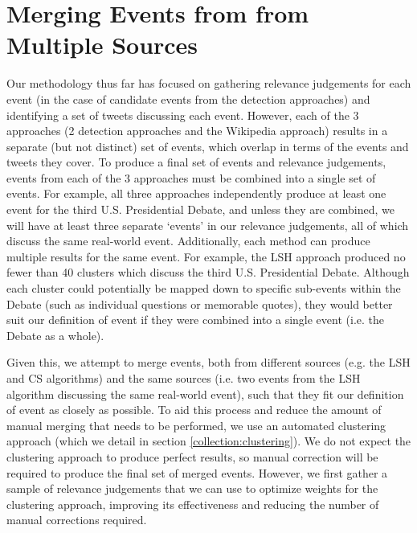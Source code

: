 \section{Merging Events from from Multiple Sources}
\label{sec:merge}
Our methodology thus far has focused on gathering relevance judgements for each event (in the case of candidate events from the detection approaches) and identifying a set of tweets discussing each event.
However, each of the 3 approaches (2 detection approaches and the Wikipedia approach) results in a separate (but not distinct) set of events, which overlap in terms of the events and tweets they cover.
To produce a final set of events and relevance judgements, events from each of the 3 approaches must be combined into a single set of events.
For example, all three approaches independently produce at least one event for the third U.S. Presidential Debate, and unless they are combined, we will have at least three separate `events' in our relevance judgements, all of which discuss the same real-world event.
Additionally, each method can produce multiple results for the same event.
For example, the LSH approach produced no fewer than 40 clusters which discuss the third U.S. Presidential Debate.
Although each cluster could potentially be mapped down to specific sub-events within the Debate (such as individual questions or memorable quotes), they would better suit our definition of event if they were combined into a single event (i.e. the Debate as a whole).

Given this, we attempt to merge events, both from different sources (e.g. the LSH and CS algorithms) and the same sources (i.e. two events from the LSH algorithm discussing the same real-world event), such that they fit our definition of event as closely as possible.
To aid this process and reduce the amount of manual merging that needs to be performed, we use an automated clustering approach (which we detail in section \ref{collection:clustering}).
We do not expect the clustering approach to produce perfect results, so manual correction will be required to produce the final set of merged events.
However, we first gather a sample of relevance judgements that we can use to optimize weights for the clustering approach, improving its effectiveness and reducing the number of manual corrections required.

